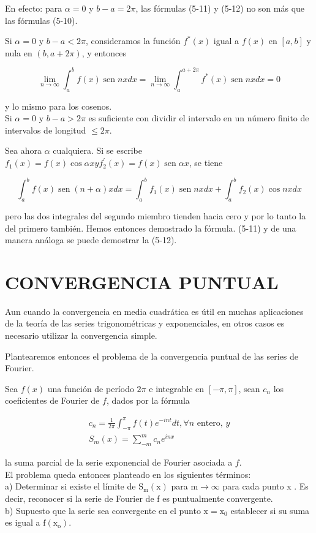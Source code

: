 \documentclass[10pt]{article}
\theoremstyle{plain}
\theoremstyle{definition}
\theoremstyle{remark}
\begin{document}
En efecto: para $\alpha=0$ y $b-a=2 \pi$, las fórmulas (5-11) y (5-12) no son más que las fórmulas (5-10).

Si $\alpha=0$ y $b-a<2 \pi$, consideramos la función $f^{*}(x)$ igual a $f(x)$ en $[a, b]$ y nula en $(b, a+2 \pi)$, y entonces

$$
\lim _{n \rightarrow \infty} \int_{a}^{b} f(x) \operatorname{sen} n x d x=\lim _{n \rightarrow \infty} \int_{a}^{a+2 \pi} f^{*}(x) \operatorname{sen} n x d x=0
$$

y lo mismo para los cosenos.\\
Si $\alpha=0$ y $b-a>2 \pi$ es suficiente con dividir el intervalo en un número finito de intervalos de longitud $\leqslant 2 \pi$.

Sea ahora $\alpha$ cualquiera. Si se escribe $f_{1}(x)=f(x) \cos \alpha x y f_{2}^{\prime}(x)=f(x) \operatorname{sen} \alpha x$, se tiene

$$
\int_{a}^{b} f(x) \operatorname{sen}(n+\alpha) x d x=\int_{a}^{b} f_{1}(x) \operatorname{sen} n x d x+\int_{a}^{b} f_{2}(x) \cos n x d x
$$

pero las dos integrales del segundo miembro tienden hacia cero y por lo tanto la del primero también. Hemos entonces demostrado la fórmula. (5-11) y de una manera análoga se puede demostrar la (5-12).

\section*{CONVERGENCIA PUNTUAL}
Aun cuando la convergencia en media cuadrática es útil en muchas aplicaciones de la teoría de las series trigonométricas y exponenciales, en otros casos es necesario utilizar la convergencia simple.

Plantearemos entonces el problema de la convergencia puntual de las series de Fourier.

Sea $f(x)$ una función de período $2 \pi$ e integrable en $[-\pi, \pi]$, sean $c_{n}$ los coeficientes de Fourier de $f$, dados por la fórmula


\begin{gather*}
c_{n}=\frac{1}{2 \pi} \int_{-\pi}^{\pi} f(t) e^{-i n t} d t, \forall n \text { entero, } y  \tag{5-13}\\
S_{m}(x)=\sum_{-m}^{m} c_{n} e^{i n x} \tag{5-14}
\end{gather*}


la suma parcial de la serie exponencial de Fourier asociada a $f$.\\
El problema queda entonces planteado en los siguientes términos:\\
a) Determinar si existe el límite de $\mathrm{S}_{\mathrm{m}}(\mathrm{x})$ para $\mathrm{m} \rightarrow \infty$ para cada punto x . Es decir, reconocer si la serie de Fourier de f es puntualmente convergente.\\
b) Supuesto que la serie sea convergente en el punto $\mathrm{x}=\mathrm{x}_{0}$ establecer si su suma es igual a $\mathrm{f}\left(\mathrm{x}_{\mathrm{o}}\right)$.
\end{document}
